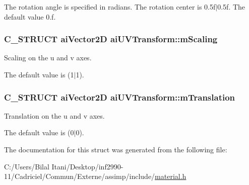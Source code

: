 The rotation angle is specified in radians. The rotation center is 0.\+5f$\vert$0.5f. The default value 0.\+f. 
\subsubsection[{\texorpdfstring{m\+Scaling}{mScaling}}]{\setlength{\rightskip}{0pt plus 5cm}C\+\_\+\+S\+T\+R\+U\+CT {\bf ai\+Vector2D} ai\+U\+V\+Transform\+::m\+Scaling}\hypertarget{structai_u_v_transform_a89429a027cbf914e7212e48149a957c8}{}\label{structai_u_v_transform_a89429a027cbf914e7212e48149a957c8}
Scaling on the u and v axes.

The default value is (1$\vert$1). 
\subsubsection[{\texorpdfstring{m\+Translation}{mTranslation}}]{\setlength{\rightskip}{0pt plus 5cm}C\+\_\+\+S\+T\+R\+U\+CT {\bf ai\+Vector2D} ai\+U\+V\+Transform\+::m\+Translation}\hypertarget{structai_u_v_transform_a8c7f35959aa342bf0cef670246fbb813}{}\label{structai_u_v_transform_a8c7f35959aa342bf0cef670246fbb813}
Translation on the u and v axes.

The default value is (0$\vert$0). 

The documentation for this struct was generated from the following file\+:\begin{DoxyCompactItemize}
\item 
C\+:/\+Users/\+Bilal Itani/\+Desktop/inf2990-\/11/\+Cadriciel/\+Commun/\+Externe/assimp/include/\hyperlink{material_8h}{material.\+h}\end{DoxyCompactItemize}
